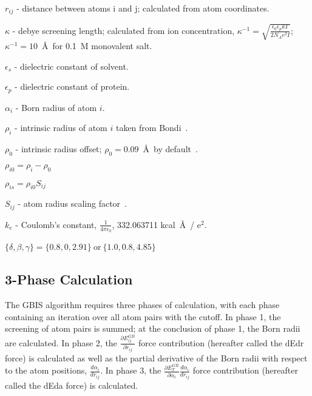 \begin{list}{}
\item $r_{ij}$ - distance between atoms i and j; calculated from atom coordinates.
\item $\kappa$ - debye screening length; calculated from ion concentration, $\kappa^{-1} = \sqrt{\frac{\epsilon_0 \epsilon_p k T}{2 N_A e^2 I}}$; $\kappa^{-1} = 10$~\AA~for 0.1~M monovalent salt.
\item $\epsilon_s$ - dielectric constant of solvent.
\item $\epsilon_p$ - dielectric constant of protein.
\item $\alpha_i$ - Born radius of atom $i$.
\item $\rho_i$ - intrinsic radius of atom $i$ taken from Bondi~\cite{BOND64}.
\item $\rho_0$ - intrinsic radius offset; $\rho_0 = 0.09$~\AA~by default~\cite{ONUF04}.
\item $\rho_{i0} = \rho_i - \rho_0$
\item $\rho_{is} = \rho_{i0} S_{ij}$
\item $S_{ij}$ - atom radius scaling factor~\cite{HAWK96,SRIN99}.
\item $k_e$ - Coulomb's constant, $\frac{1}{4 \pi \epsilon_0}$, 332.063711 kcal~\AA~/ e$^2$.
\item $\{\delta, \beta, \gamma\} = \{0.8, 0, 2.91\}~\textrm{or}~\{1.0, 0.8, 4.85\}$~\cite{ONUF04}
\end{list}


\subsection{3-Phase Calculation}

The GBIS algorithm requires three phases of calculation, with each phase containing an iteration over all atom pairs with the cutoff.
In phase 1, the screening of atom pairs is summed; at the conclusion of phase 1, the Born radii are calculated.
In phase 2, the $\frac{\partial E_{ij}^{GB}}{\partial r_{ij}}$ force contribution (hereafter called the dEdr force) is calculated as well as the partial derivative of the Born radii with respect to the atom positions, $\frac{d \alpha_i}{d r_{ij}}$.
In phase 3, the $\frac{\partial E_T^{GB}}{\partial \alpha_i}\frac{d \alpha_i}{d r_{ij}}$ force contribution (hereafter called the dEda force) is calculated.


